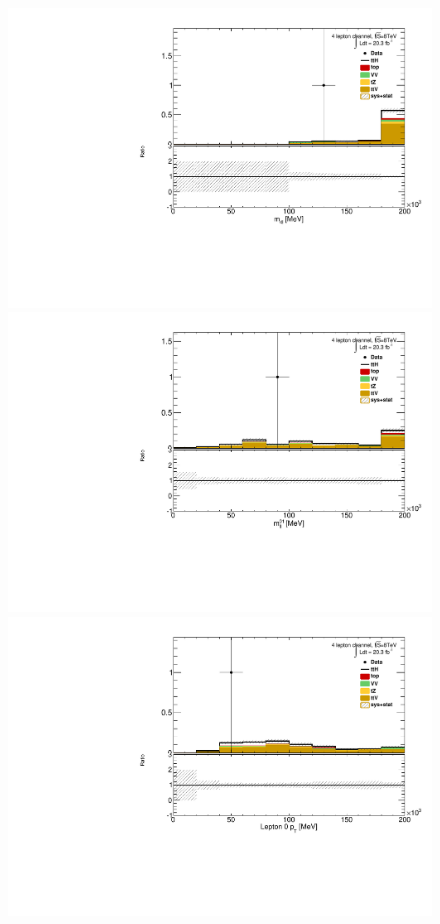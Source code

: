 \begin{figure}[!htbp]
  \begin{minipage}[h]{0.5\textwidth}
    \centering \includegraphics[width=\textwidth]{figs/results/plotCand_4lep_Mllll}
  \end{minipage}\hfill
  \begin{minipage}[h]{0.5\textwidth}
    \centering \includegraphics[width=\textwidth]{figs/results/plotCand_4lep_Mll01}
  \end{minipage}\hfill
  \begin{minipage}[h]{0.5\textwidth}
    \centering \includegraphics[width=\textwidth]{figs/results/plotCand_4lep_Lep0Pt}

\end{minipage}
\end{figure}
